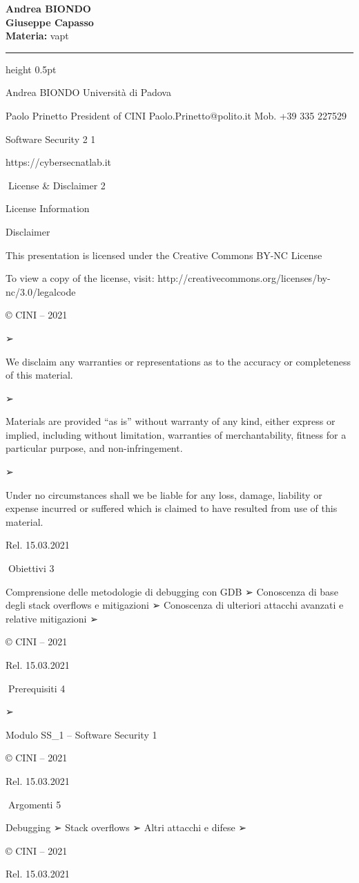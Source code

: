 \documentclass[11pt,a4paper]{article}
\newcommand{\proposaltitle}[1]{
    \begin{center}
        \vspace*{0.1cm}
        {\LARGE \bfseries \color{blue} #1} \\[1.5ex]
        {\large \textbf{Giuseppe Capasso}} \\[1ex]
                \small{
            \vspace{0.1cm}
            \textbf{Materia:} vapt\\
        }
            \end{center}
    \vspace{0.3cm}
    \hrule height 0.5pt
    \vspace{0.5cm}
}
\begin{document}
\proposaltitle{Andrea BIONDO}

Andrea BIONDO Università di Padova

Paolo Prinetto President of CINI Paolo.Prinetto@polito.it Mob. +39 335
227529

Software Security 2 1

https://cybersecnatlab.it

License \& Disclaimer 2

License Information

Disclaimer

This presentation is licensed under the Creative Commons BY-NC License

To view a copy of the license, visit:
http://creativecommons.org/licenses/by-nc/3.0/legalcode

© CINI -- 2021

➢

We disclaim any warranties or representations as to the accuracy or
completeness of this material.

➢

Materials are provided ``as is'' without warranty of any kind, either
express or implied, including without limitation, warranties of
merchantability, fitness for a particular purpose, and non-infringement.

➢

Under no circumstances shall we be liable for any loss, damage,
liability or expense incurred or suffered which is claimed to have
resulted from use of this material.

Rel. 15.03.2021

Obiettivi 3

Comprensione delle metodologie di debugging con GDB ➢ Conoscenza di base
degli stack overflows e mitigazioni ➢ Conoscenza di ulteriori attacchi
avanzati e relative mitigazioni ➢

© CINI -- 2021

Rel. 15.03.2021

Prerequisiti 4

➢

Modulo SS\_1 -- Software Security 1

© CINI -- 2021

Rel. 15.03.2021

Argomenti 5

Debugging ➢ Stack overflows ➢ Altri attacchi e difese ➢

© CINI -- 2021

Rel. 15.03.2021
\end{document}
